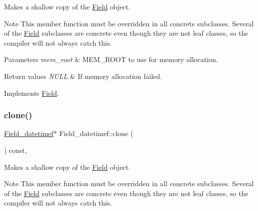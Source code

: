Makes a shallow copy of the \mbox{\hyperlink{classField}{Field}} object.

\begin{DoxyNote}{Note}
This member function must be overridden in all concrete subclasses. Several of the \mbox{\hyperlink{classField}{Field}} subclasses are concrete even though they are not leaf classes, so the compiler will not always catch this.
\end{DoxyNote}

\begin{DoxyParams}{Parameters}
{\em mem\+\_\+root} & M\+E\+M\+\_\+\+R\+O\+OT to use for memory allocation. \\
\hline
\end{DoxyParams}

\begin{DoxyRetVals}{Return values}
{\em N\+U\+LL} & If memory allocation failed. \\
\hline
\end{DoxyRetVals}


Implements \mbox{\hyperlink{classField_a64979bcb9345803b031fff76a0c3d9fe}{Field}}.

\mbox{\label{classField__datetimef_aef1cb14340d9b5e3bcd12d9314e922b4}} 
\subsubsection{\texorpdfstring{clone()}{clone()}\hspace{0.1cm}{\footnotesize\ttfamily [2/2]}}
{\footnotesize\ttfamily \mbox{\hyperlink{classField__datetimef}{Field\+\_\+datetimef}}$\ast$ Field\+\_\+datetimef\+::clone (\begin{DoxyParamCaption}{ }\end{DoxyParamCaption}) const\hspace{0.3cm}{\ttfamily [inline]}, {\ttfamily [virtual]}}

Makes a shallow copy of the \mbox{\hyperlink{classField}{Field}} object.

\begin{DoxyNote}{Note}
This member function must be overridden in all concrete subclasses. Several of the \mbox{\hyperlink{classField}{Field}} subclasses are concrete even though they are not leaf classes, so the compiler will not always catch this.
\end{DoxyNote}

